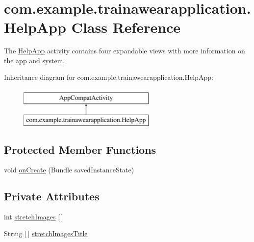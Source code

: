 \hypertarget{classcom_1_1example_1_1trainawearapplication_1_1_help_app}{}\section{com.\+example.\+trainawearapplication.\+Help\+App Class Reference}
\label{classcom_1_1example_1_1trainawearapplication_1_1_help_app}


The \mbox{\hyperlink{classcom_1_1example_1_1trainawearapplication_1_1_help_app}{Help\+App}} activity contains four expandable views with more information on the app and system.  


Inheritance diagram for com.\+example.\+trainawearapplication.\+Help\+App\+:\begin{figure}[H]
\begin{center}
\leavevmode
\includegraphics[height=2.000000cm]{classcom_1_1example_1_1trainawearapplication_1_1_help_app}
\end{center}
\end{figure}
\subsection*{Protected Member Functions}
\begin{DoxyCompactItemize}
\item 
void \mbox{\hyperlink{classcom_1_1example_1_1trainawearapplication_1_1_help_app_a8fb144074fe5f839efbbdbfb16edd528}{on\+Create}} (Bundle saved\+Instance\+State)
\end{DoxyCompactItemize}
\subsection*{Private Attributes}
\begin{DoxyCompactItemize}
\item 
int \mbox{\hyperlink{classcom_1_1example_1_1trainawearapplication_1_1_help_app_a409e91221d680c3d801ea24a3f58fcdc}{stretch\+Images}} \mbox{[}$\,$\mbox{]}
\item 
String \mbox{[}$\,$\mbox{]} \mbox{\hyperlink{classcom_1_1example_1_1trainawearapplication_1_1_help_app_a3f603b19da94b591732a36617c2eb91d}{stretch\+Images\+Title}}
\end{DoxyCompactItemize}


